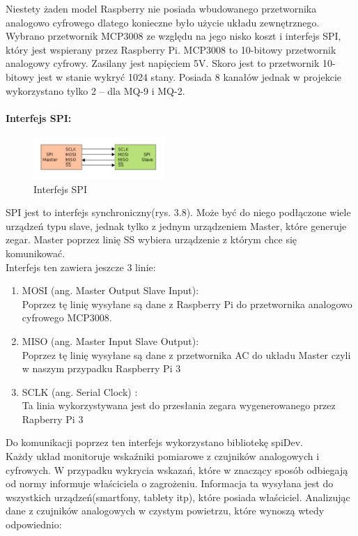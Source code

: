Niestety żaden model Raspberry nie posiada wbudowanego przetwornika analogowo cyfrowego dlatego konieczne było użycie układu zewnętrznego. Wybrano przetwornik MCP3008 ze względu na jego nisko koszt i interfejs SPI, który jest wspierany przez Raspberry Pi. MCP3008 to 10-bitowy przetwornik analogowy cyfrowy. Zasilany jest napięciem 5V.  Skoro jest to przetwornik 10-bitowy jest w stanie wykryć 1024 stany. Posiada 8 kanałów jednak w projekcie wykorzystano tylko 2 – dla MQ-9 i MQ-2.
\paragraph{Interfejs SPI:}
\begin{figure}[ht]
	\centering
	\includegraphics[width=5cm]{SPI.png}
	\caption{Interfejs SPI \cite{spi}}
\end{figure}
SPI jest to interfejs synchroniczny(rys. 3.8). Może być do niego podłączone wiele urządzeń typu slave, jednak tylko z jednym urządzeniem Master, które generuje zegar. Master poprzez linię SS wybiera urządzenie z którym chce się komunikować. \\
Interfejs ten zawiera jeszcze 3 linie:
\begin{enumerate} 
\item MOSI (ang. Master Output Slave Input): \\
Poprzez tę linię wysyłane są dane z Raspberry Pi do przetwornika analogowo cyfrowego MCP3008.
\item MISO (ang. Master Input Slave Output):\\
Poprzez tę linię wysyłane są dane z przetwornika AC do układu Master czyli w naszym przypadku Raspberry Pi 3
\item SCLK (ang. Serial Clock) :\\
Ta linia wykorzystywana jest do przesłania zegara wygenerowanego przez Rapberry Pi 3
\end{enumerate}
Do komunikacji poprzez ten interfejs wykorzystano bibliotekę spiDev. \\
Każdy układ monitoruje wskaźniki pomiarowe z czujników analogowych i cyfrowych. W przypadku wykrycia wskazań, które w znaczący sposób odbiegają od normy informuje właściciela o zagrożeniu. Informacja ta wysyłana jest do wszystkich urządzeń(smartfony, tablety itp), które posiada właściciel.  Analizując dane z czujników analogowych w czystym powietrzu, które wynoszą wtedy odpowiednio:\\
